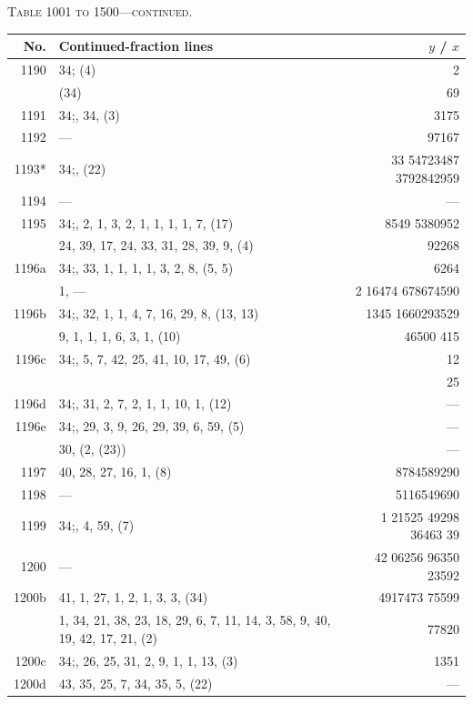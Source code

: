 \documentclass[11pt]{article}
\newcommand{\peheading}{%
  \begin{center}\small\textsc{Table 1001 to 1500---continued.}\end{center}
}
\begin{document}
\peheading
\renewcommand{\arraystretch}{1.15}
{\footnotesize
\begin{longtable}{|r|p{8.5cm}|r|}
\hline
\textbf{No.} & \textbf{Continued-fraction lines} & \textbf{$y$ \;/\; $x$}\\
\hline\endhead
1190   & $34$;\; (4) & 2 \\
       & (34) & 69 \\
\hline
1191   & $34$;\; 1, 34, (3) & 3175 \\
\hline
1192   & --- & 97167 \\
\hline
1193*  & $34$;\; 1, (22) & 33 54723487 3792842959 \\
\hline
1194   & --- & --- \\
\hline
1195   & $34$;\; 35, 2, 1, 3, 2, 1, 1, 1, 1, 7, (17) & 8549 5380952 \\
       & 24, 39, 17, 24, 33, 31, 28, 39, 9, (4) & 92268 \\
\hline
1196a  & $34$;\; 36, 33, 1, 1, 1, 1, 3, 2, 8, (5, 5) & 6264 \\
       & 1, --- & 2 16474 678674590 \\
\hline
1196b  & $34$;\; 37, 32, 1, 1, 4, 7, 16, 29, 8, (13, 13) & 1345 1660293529 \\
       & 9, 1, 1, 1, 6, 3, 1, (10) & 46500 415 \\
\hline
1196c  & $34$;\; 19, 5, 7, 42, 25, 41, 10, 17, 49, (6) & 12 \\
       & & 25 \\
\hline
1196d  & $34$;\; 38, 31, 2, 7, 2, 1, 1, 10, 1, (12) & --- \\
\hline
1196e  & $34$;\; 39, 29, 3, 9, 26, 29, 39, 6, 59, (5) & --- \\
       & 30, (2, (23)) & --- \\
\hline
1197   & 40, 28, 27, 16, 1, (8) & 8784589290 \\
\hline
1198   & --- & 5116549690 \\
\hline
1199   & $34$;\; 1, 4, 59, (7) & 1 21525 49298 36463 39 \\
\hline
1200   & --- & 42 06256 96350 23592 \\
\hline
1200b  & 41, 1, 27, 1, 2, 1, 3, 3, (34) & 4917473 75599 \\
       & 1, 34, 21, 38, 23, 18, 29, 6, 7, 11, 14, 3, 58, 9, 40, 19, 42, 17, 21, (2) & 77820 \\
\hline
1200c  & $34$;\; 42, 26, 25, 31, 2, 9, 1, 1, 13, (3) & 1351 \\
\hline
1200d  & 43, 35, 25, 7, 34, 35, 5, (22) & --- \\

\end{longtable}}
\end{document}
